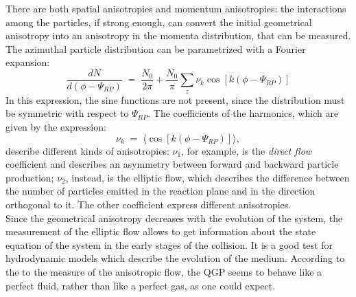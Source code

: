 %
There are both spatial anisotropies and momentum anisotropies: the interactions among the particles, if strong enough, can convert the initial geometrical anisotropy into an anisotropy in the momenta distribution, that can be measured.\\
The azimuthal particle distribution can be parametrized with a Fourier expansion:
\begin{equation}
 \frac{dN}{d(\phi-\Psi_{RP})}\;=\;\frac{N_{0}}{2\pi} + \frac{N_{0}}{\pi}\sum_{z} \nu_{k}\cos[k(\phi-\Psi_{RP})]
\end{equation}
In this expression, the sine functions are not present, since the distribution must be symmetric with respect to $\Psi_{RP}$.
The coefficients of the harmonics, which are given by the expression:
\begin{equation}
 \nu_{k}\;=\;\langle \cos[k(\phi-\Psi_{RP})]\rangle,
\end{equation}
describe different kinds of anisotropies: $\nu_{1}$, for example, is the \textit{direct flow} coefficient and describes an asymmetry between forward and backward particle production; $\nu_{2}$, instead, is the elliptic flow, which describes the difference between the number of particles emitted in the reaction plane and in the direction orthogonal to it. The other coefficient express different anisotropies.\\
Since the geometrical anisotropy decreases with the evolution of the system, the measurement of the elliptic flow allows to get information about the state equation of the system in the early stages of the collision. It is a good test for hydrodynamic models which describe the evolution of the medium. According to the to the measure of the anisotropic flow, the QGP seems to behave like a perfect fluid, rather than like a perfect gas, as one could expect.
%
